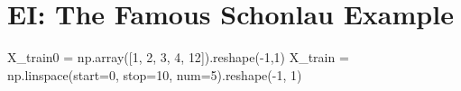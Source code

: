 \documentclass[
  letterpaper,
  DIV=11,
  numbers=noendperiod]{scrreprt}
\newenvironment{Shaded}{\begin{snugshade}}{\end{snugshade}}
\newcommand{\DecValTok}[1]{\textcolor[rgb]{0.68,0.00,0.00}{#1}}
\newcommand{\NormalTok}[1]{\textcolor[rgb]{0.00,0.23,0.31}{#1}}
\newcommand{\OperatorTok}[1]{\textcolor[rgb]{0.37,0.37,0.37}{#1}}
\begin{document}
\section{EI: The Famous Schonlau
Example}\label{ei-the-famous-schonlau-example}

\begin{Shaded}
\begin{Highlighting}[]
\NormalTok{X\_train0 }\OperatorTok{=}\NormalTok{ np.array([}\DecValTok{1}\NormalTok{, }\DecValTok{2}\NormalTok{, }\DecValTok{3}\NormalTok{, }\DecValTok{4}\NormalTok{, }\DecValTok{12}\NormalTok{]).reshape(}\OperatorTok{{-}}\DecValTok{1}\NormalTok{,}\DecValTok{1}\NormalTok{)}
\NormalTok{X\_train }\OperatorTok{=}\NormalTok{ np.linspace(start}\OperatorTok{=}\DecValTok{0}\NormalTok{, stop}\OperatorTok{=}\DecValTok{10}\NormalTok{, num}\OperatorTok{=}\DecValTok{5}\NormalTok{).reshape(}\OperatorTok{{-}}\DecValTok{1}\NormalTok{, }\DecValTok{1}\NormalTok{)}
\end{Highlighting}
\end{Shaded}
\end{document}
